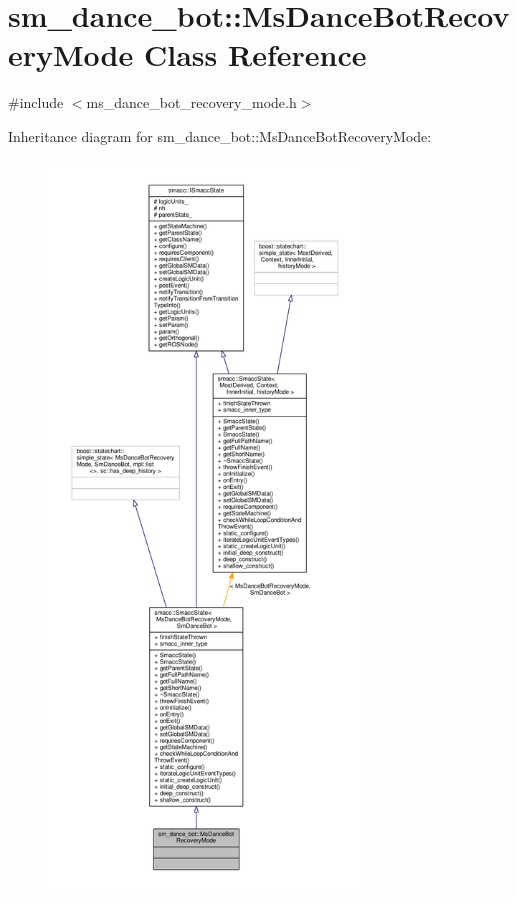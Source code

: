 \hypertarget{classsm__dance__bot_1_1MsDanceBotRecoveryMode}{}\section{sm\+\_\+dance\+\_\+bot\+:\+:Ms\+Dance\+Bot\+Recovery\+Mode Class Reference}
\label{classsm__dance__bot_1_1MsDanceBotRecoveryMode}


{\ttfamily \#include $<$ms\+\_\+dance\+\_\+bot\+\_\+recovery\+\_\+mode.\+h$>$}



Inheritance diagram for sm\+\_\+dance\+\_\+bot\+:\+:Ms\+Dance\+Bot\+Recovery\+Mode\+:\nopagebreak
\begin{figure}[H]
\begin{center}
\leavevmode
\includegraphics[height=550pt]{classsm__dance__bot_1_1MsDanceBotRecoveryMode__inherit__graph}
\end{center}
\end{figure}


